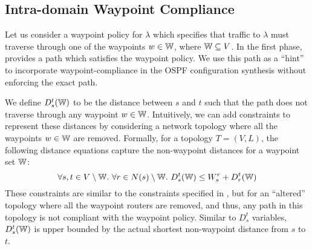 \subsection{Intra-domain Waypoint Compliance}\label{sec:ospfwaypoint}
Let us consider a waypoint policy for $\lambda$ which
specifies that traffic to $\lambda$ must traverse through
one of the waypoints $w \in \mathbb{W}$, where $\mathbb{W} \subseteq V$.
In the first phase, \genesis provides a path which
satisfies the waypoint policy. We use this path as a 
``hint'' to incorporate waypoint-compliance in the OSPF 
configuration synthesis without 
enforcing the exact path.

We define $D_s^t(\mathbb{W})$ to be the 
distance between $s$ and $t$ such that the path does not
 traverse through any waypoint $w \in \mathbb{W}$. Intuitively, we
  can add constraints to represent these distances by
  considering a network topology where all the  
  waypoints $w \in \mathbb{W}$ are removed. Formally, for a topology 
 $T = (V,L)$, the following distance equations 
 capture the non-waypoint distances 
 for a waypoint set $\mathbb{W}$:
\begin{equation} \label{eq:wdistance}
\forall s, t \in V \setminus \mathbb{W}. ~\forall r \in N(s) \setminus \mathbb{W}.~
D_s^t(\mathbb{W}) \leq W_s^r + D_r^t(\mathbb{W})
\end{equation}
These constraints are similar to the constraints specified in
, but for an ``altered'' topology where all
the waypoint routers are removed, and thus, any path in this 
topology is not compliant with the waypoint policy. 
Similar to $D_s^t$ variables, 
$D_s^t(\mathbb{W})$ is upper bounded by the actual shortest non-waypoint distance from $s$ to $t$.

